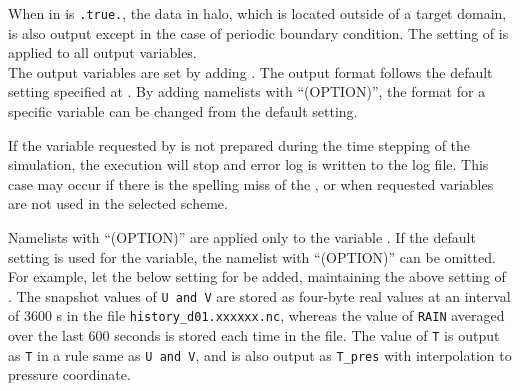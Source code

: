 When  in  is \verb|.true.|,
the data in halo, which is located outside of a target domain, is also output except in the case of periodic boundary condition.
The setting of  is applied to all output variables.\\

The output variables are set by adding .
The output format follows the default setting specified at .
By adding namelists with ``(OPTION)'', the format for a specific variable can be changed from the default setting.


If the variable requested by  is not prepared during the time stepping of the simulation, the execution will stop and error log is written to the log file.
This case may occur if there is the spelling miss of the , or when requested variables are not used in the selected scheme.

Namelists with ``(OPTION)'' are applied only to the variable . If the default setting is used for the variable, the namelist with ``(OPTION)'' can be omitted. For example, let the below setting for  be added, maintaining the above setting of . The snapshot values of \verb|U and V| are stored as four-byte real values at an interval of 3600 s in the file \verb|history_d01.xxxxxx.nc|, whereas the value of \verb|RAIN| averaged over the last 600 seconds is stored each time in the file. The value of \verb|T| is output as \verb|T| in a rule same as \verb|U and V|, and is also output as \verb|T_pres| with interpolation to pressure coordinate.

